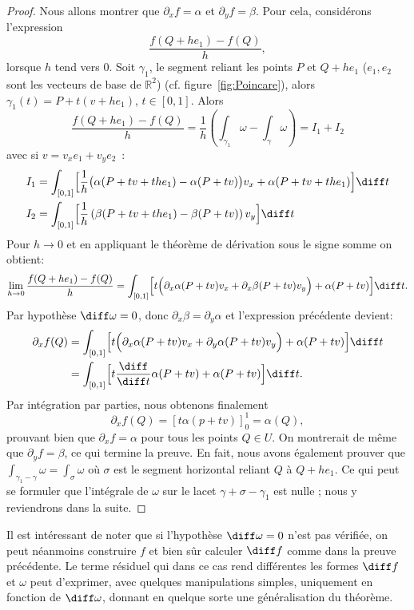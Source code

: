 \begin{proof}
Nous allons montrer que $\partial_x f=\alpha$ et $\partial_y f=\beta$. Pour cela, considérons l'expression 
\[ \frac{f(Q+ h e_1)-f(Q)}{h},\]
lorsque $h$ tend vers $0$. Soit $\gamma_1$, le segment reliant les points $P$ et $Q + h e_1$ ($e_1,e_2$ sont les vecteurs de base de $\mathbb{R}^2$) (cf. figure~\ref{fig:Poincare}), alors $\gamma_1(t) = P + t(v + h e_1)$, $t \in [0,1]$. Alors 
\[\frac{f(Q+ h e_1)-f(Q)}{h}  = \frac{1}{h} \left( \int_{\gamma_1} \omega  - \int_{\gamma} \omega \right)=I_1 + I_2\]
avec si $v = v_x e_1 + v_y e_2$~:
\begin{align*}
I_1 & =\int_{[0,1]} \Bigl[ \frac{1}{h} \bigl( \alpha(P + t v + t h e_1) - \alpha(P + t v) \bigr) v_x + \alpha(P + t v + t h e_1)\Bigr] \diff t \\
I_2 & = \int_{[0,1]} \Bigl[ \frac{1}{h} \left( \beta(P + tv + t h e_1) - \beta(P + t v) \right) v_y \Bigr] \diff t
\end{align*}
Pour $h \rightarrow 0$ et en appliquant le théorème de dérivation sous le signe somme 
on obtient:
\[\lim_{h \rightarrow 0} \frac{f(Q+ h e_1)-f(Q)}{h} = \int_{[0,1]}  \Bigl[ t \Bigl(\partial_x
\alpha(P+tv) v_x  +  \partial_x
\beta(P+tv)v_y \Bigr)+ \alpha(P+tv) \Bigr]  \diff t.\]
Par hypothèse $\diff \omega = 0$, donc $\partial_x \beta=\partial _y \alpha$
et l'expression précédente devient:
\begin{align*}
\partial_x f (Q) & =  \int_{[0,1]}  \Bigl[ t \Bigl(\partial_x
\alpha(P+tv) v_x  +  \partial_y
\alpha(P+tv)v_y \Bigr)+ \alpha(P+tv) \Bigr]  \diff t \\
&= \int_{[0,1]}  \Bigl[ t  \frac{\diff}{\diff t} \alpha(P + t v)+ \alpha(P+tv) \Bigr]  \diff t.
\end{align*}
Par intégration par parties, nous obtenons finalement
\[\partial_x f (Q) = \left[t \alpha(p+tv)\right]_0^1 = \alpha(Q),
\]
prouvant bien que $\partial_x f = \alpha$ pour tous les points $Q \in U$. On montrerait de même que $\partial_y f = \beta$, ce qui termine la preuve. En fait, nous avons également prouver que $\int_{\gamma_1 -\gamma} \omega=\int_{\sigma} \omega$ où $\sigma$ est le segment horizontal reliant $Q$ à $Q + h e_1$. Ce qui peut se formuler que l'intégrale de $\omega$ sur le lacet $\gamma + \sigma-\gamma_1$ est nulle ; nous y reviendrons dans la suite. 
\end{proof}
Il est intéressant de noter que si l'hypothèse $\diff \omega =0$ n'est pas vérifiée,
on peut néanmoins construire $f$ et bien sûr calculer $\diff f$ comme dans la preuve
précédente. Le terme résiduel qui dans ce cas rend différentes les formes $\diff f$
et $\omega$ peut d'exprimer, avec quelques manipulations simples, uniquement en
fonction de $\diff \omega$, donnant en quelque sorte une généralisation du théorème.

